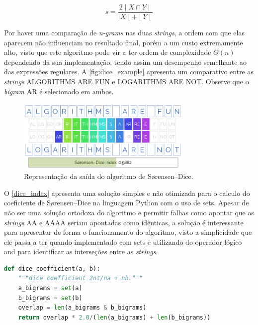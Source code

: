 \begin{equation}\label{dice_equation}
  s = \frac{2\mid X\cap Y\mid}{\mid X\mid+\mid Y\mid}
\end{equation}

Por haver uma comparação de \textit{n-grams} nas duas \textit{strings}, a ordem com que elas aparecem não influenciam no resultado final, porém  a um custo extremamente alto, visto que este algoritmo pode vir a ter ordem de complexidade $\Theta(n)$ dependendo da sua implementação, tendo assim um desempenho semelhante ao das expressões regulares. A \autoref{fig:dice_example} apresenta um comparativo entre as \textit{strings} {\code ALGORITHMS ARE FUN} e {\code LOGARITHMS ARE NOT}. Observe que o \textit{bigram} {\code AR} é selecionado em ambos.

\begin{figure}[h]
  \centering
  \includegraphics[width=0.75\textwidth]{figuras/dice}
  \caption{Representação da saída do algoritmo de Sørensen–Dice\protect\footnotemark.}
  \label{fig:dice_example}
\end{figure}

O \autoref{dice_index} apresenta uma solução simples e não otimizada para o calculo do coeficiente de Sørensen–Dice na linguagem Python com o uso de {\code sets}. Apesar de não ser uma solução ortodoxa do algoritmo e permitir falhas como apontar que as \textit{strings} {\code AA} e {\code AAAA} seriam apontadas como idênticas, a solução é interessante para apresentar de forma o funcionamento do algoritmo, visto a simplicidade que ele passa a ter quando implementado com {\code sets} e utilizando do operador lógico {\code and} para identificar as interseções entre as \textit{strings}.

\begin{lstlisting}[language=Python,label=dice_index,caption={Simples implementação do coeficiente de Sørensen–Dice}]
def dice_coefficient(a, b):
    """dice coefficient 2nt/na + nb."""
    a_bigrams = set(a)
    b_bigrams = set(b)
    overlap = len(a_bigrams & b_bigrams)
    return overlap * 2.0/(len(a_bigrams) + len(b_bigrams))
\end{lstlisting}


